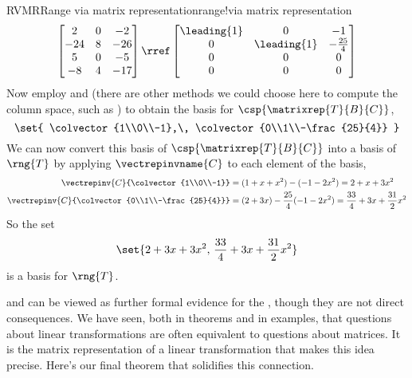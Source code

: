 \begin{example}{RVMR}{Range via matrix representation}{range!via matrix representation}
 \begin{equation*}
 \begin{bmatrix}
 2 & 0 & -2 \\
 -24 & 8 & -26 \\
 5 & 0 & -5 \\
 -8 & 4 & -17
 \end{bmatrix}
 \rref
 \begin{bmatrix}
 \leading{1} & 0 & -1 \\
 0 & \leading{1} & -\frac{25}{4} \\
 0 & 0 & 0 \\
 0 & 0 & 0
 \end{bmatrix}
 \end{equation*}
Now employ  and  (there are other methods we could choose here to compute the column space, such as ) to obtain the basis for $\csp{\matrixrep{T}{B}{C}}$,
%
\begin{equation*}
\set{
\colvector{1\\0\\-1},\,
\colvector{0\\1\\-\frac{25}{4}}
}
\end{equation*}
%
We can  now convert this basis of $\csp{\matrixrep{T}{B}{C}}$ into a basis of $\rng{T}$ by applying $\vectrepinvname{C}$ to each element of the basis,
%
\begin{align*}
\vectrepinv{C}{\colvector{1\\0\\-1}}&=
(1+x+x^2)-(-1-2x^2)=2+x+3x^2\\
%
\vectrepinv{C}{\colvector{0\\1\\-\frac{25}{4}}}&=
(2+3x)-\frac{25}{4}(-1-2x^2)=\frac{33}{4}+3x+\frac{31}{2}x^2
\end{align*}
%
So the set
%
\begin{equation*}
\set{
2+3x+3x^2,\,
\frac{33}{4}+3x+\frac{31}{2}x^2
}
\end{equation*}
%
is a basis for $\rng{T}$.
%
\end{example}
%
 and  can be viewed as further formal evidence for the , though they are not direct consequences.
%
%
%
We have seen, both in theorems and in examples, that questions about linear transformations are often equivalent to questions about matrices.  It is the matrix representation of a linear transformation that makes this idea precise.  Here's our final theorem that solidifies this connection.
